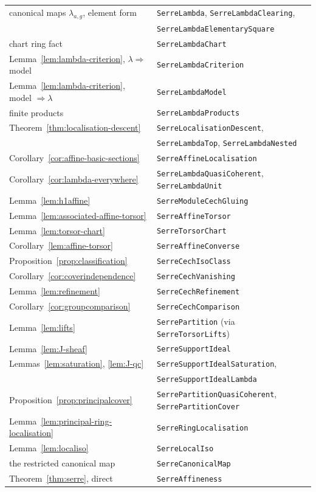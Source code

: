 \documentclass[11pt]{amsart}
\theoremstyle{definition}\newtheorem{definition}[theorem]{Definition}
\theoremstyle{remark}\newtheorem{remark}[theorem]{Remark}
\newcommand{\code}[1]{{\small\texttt{#1}}}
\begin{document}
\begin{center}\small
\begin{tabular}{ll}
canonical maps $\lambda_{a,g}$, element form & \code{SerreLambda}, \code{SerreLambdaClearing},\\
 & \code{SerreLambdaElementarySquare}\\
chart ring fact & \code{SerreLambdaChart}\\
Lemma~\ref{lem:lambda-criterion}, $\lambda\Rightarrow$ model & \code{SerreLambdaCriterion}\\
Lemma~\ref{lem:lambda-criterion}, model $\Rightarrow\lambda$ & \code{SerreLambdaModel}\\
finite products & \code{SerreLambdaProducts}\\
Theorem~\ref{thm:localisation-descent} & \code{SerreLocalisationDescent},\\
 & \code{SerreLambdaTop}, \code{SerreLambdaNested}\\
Corollary~\ref{cor:affine-basic-sections} & \code{SerreAffineLocalisation}\\
Corollary~\ref{cor:lambda-everywhere} & \code{SerreLambdaQuasiCoherent}, \code{SerreLambdaUnit}\\
Lemma~\ref{lem:h1affine} & \code{SerreModuleCechGluing}\\
Lemma~\ref{lem:associated-affine-torsor} & \code{SerreAffineTorsor}\\
Lemma~\ref{lem:torsor-chart} & \code{SerreTorsorChart}\\
Corollary~\ref{lem:affine-torsor} & \code{SerreAffineConverse}\\
Proposition~\ref{prop:classification} & \code{SerreCechIsoClass}\\
Corollary~\ref{cor:coverindependence} & \code{SerreCechVanishing}\\
Lemma~\ref{lem:refinement} & \code{SerreCechRefinement}\\
Corollary~\ref{cor:groupcomparison} & \code{SerreCechComparison}\\
Lemma~\ref{lem:lifts} & \code{SerrePartition} (via \code{SerreTorsorLifts})\\
Lemma~\ref{lem:J-sheaf} & \code{SerreSupportIdeal}\\
Lemmas~\ref{lem:saturation}, \ref{lem:J-qc} & \code{SerreSupportIdealSaturation},\\
 & \code{SerreSupportIdealLambda}\\
Proposition~\ref{prop:principalcover} & \code{SerrePartitionQuasiCoherent}, \code{SerrePartitionCover}\\
Lemma~\ref{lem:principal-ring-localisation} & \code{SerreRingLocalisation}\\
Lemma~\ref{lem:localiso} & \code{SerreLocalIso}\\
the restricted canonical map & \code{SerreCanonicalMap}\\
Theorem~\ref{thm:serre}, direct & \code{SerreAffineness}
\end{tabular}
\end{center}
\end{document}
